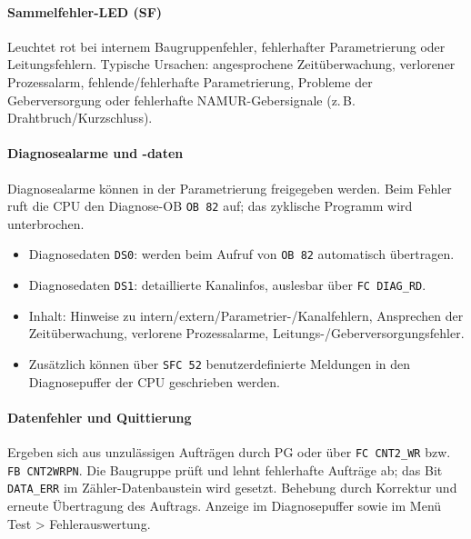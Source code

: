 \paragraph{Sammelfehler-LED (SF)}
Leuchtet rot bei internem Baugruppenfehler, fehlerhafter Parametrierung oder Leitungsfehlern. Typische Ursachen: angesprochene Zeitüberwachung, verlorener Prozessalarm, fehlende/fehlerhafte Parametrierung, Probleme der Geberversorgung oder fehlerhafte NAMUR-Gebersignale (z.\,B. Drahtbruch/Kurzschluss).

\paragraph{Diagnosealarme und -daten}
Diagnosealarme können in der Parametrierung freigegeben werden. Beim Fehler ruft die CPU den Diagnose-OB \texttt{OB 82} auf; das zyklische Programm wird unterbrochen.
\begin{itemize}
    \item Diagnosedaten \texttt{DS0}: werden beim Aufruf von \texttt{OB 82} automatisch übertragen.
    \item Diagnosedaten \texttt{DS1}: detaillierte Kanalinfos, auslesbar über \texttt{FC DIAG\_RD}.
    \item Inhalt: Hinweise zu intern/extern/Parametrier-/Kanalfehlern, Ansprechen der Zeitüberwachung, verlorene Prozessalarme, Leitungs-/Geberversorgungsfehler.
    \item Zusätzlich können über \texttt{SFC 52} benutzerdefinierte Meldungen in den Diagnosepuffer der CPU geschrieben werden.
\end{itemize}

\paragraph{Datenfehler und Quittierung}
Ergeben sich aus unzulässigen Aufträgen durch PG oder über \texttt{FC CNT2\_WR} bzw. \texttt{FB CNT2WRPN}. Die Baugruppe prüft und lehnt fehlerhafte Aufträge ab; das Bit \texttt{DATA\_ERR} im Zähler-Datenbaustein wird gesetzt. Behebung durch Korrektur und erneute Übertragung des Auftrags. Anzeige im Diagnosepuffer sowie im Menü Test \textgreater{} Fehlerauswertung.




